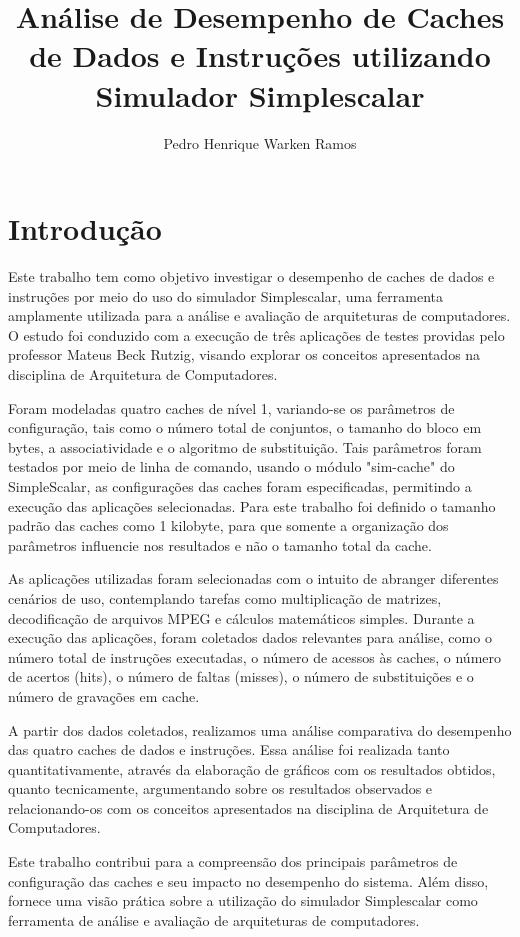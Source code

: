 \documentclass[12pt]{article}
\title{Análise de Desempenho de Caches de Dados e Instruções utilizando Simulador Simplescalar}
\author{Pedro Henrique Warken Ramos }
\begin{document}
 

\maketitle

\section{Introdução} \label{sec:introducao}

Este trabalho tem como objetivo investigar o desempenho de caches de dados e
instruções por meio do uso do simulador Simplescalar, uma ferramenta 
amplamente utilizada para a análise e avaliação de arquiteturas de 
computadores. O estudo foi conduzido com a execução de três aplicações de 
testes providas pelo professor Mateus Beck Rutzig, visando explorar os 
conceitos apresentados na disciplina de Arquitetura de Computadores.

Foram modeladas quatro caches de nível 1, variando-se os parâmetros de
configuração, tais como o número total de conjuntos, o 
tamanho do bloco em bytes, a associatividade e o algoritmo de substituição.
Tais parâmetros foram testados por meio de linha de comando, usando o módulo
"sim-cache" do SimpleScalar, as configurações das caches foram especificadas,
permitindo a execução das aplicações selecionadas. Para este trabalho foi
definido o tamanho padrão das caches como 1 kilobyte, para que somente a 
organização dos parâmetros influencie nos resultados e não o tamanho total da cache.

As aplicações utilizadas foram selecionadas com o intuito de abranger 
diferentes cenários de uso, contemplando tarefas como multiplicação de 
matrizes, decodificação de arquivos MPEG e cálculos matemáticos simples. 
Durante a execução das aplicações, foram coletados dados relevantes para 
análise, como o número total de instruções executadas, o número de acessos às 
caches, o número de acertos (hits), o número de faltas (misses), o número de 
substituições e o número de gravações em cache.

A partir dos dados coletados, realizamos uma análise comparativa do desempenho 
das quatro caches de dados e instruções. Essa análise foi realizada tanto 
quantitativamente, através da elaboração de gráficos com os resultados 
obtidos, quanto tecnicamente, argumentando sobre os resultados observados e 
relacionando-os com os conceitos apresentados na disciplina de Arquitetura de 
Computadores.

Este trabalho contribui para a compreensão dos principais parâmetros 
de configuração das caches e seu impacto no desempenho do sistema. 
Além disso, fornece uma visão prática sobre a utilização do simulador
Simplescalar como ferramenta de análise e avaliação de arquiteturas de
computadores.
\end{document}
